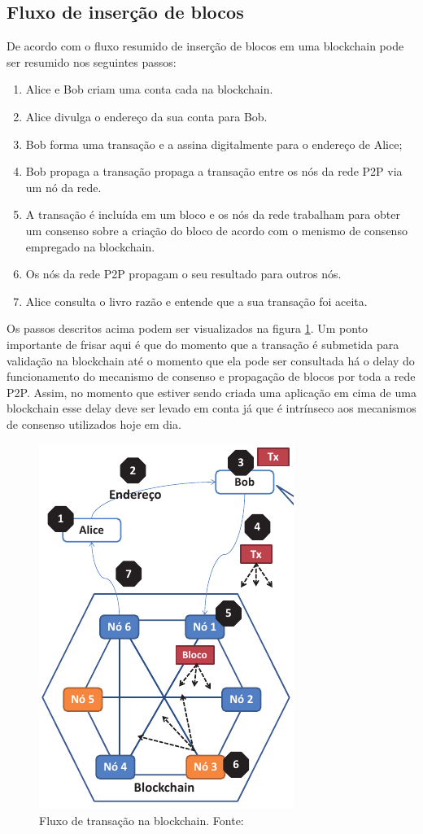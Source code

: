 \documentclass[12pt]{article}
\begin{document}
\subsection{Fluxo de inserção de blocos}
De acordo com \cite{braga2017segurancca} o fluxo resumido de inserção de blocos em uma blockchain pode ser resumido nos seguintes passos:
\begin{enumerate}
    \item Alice e Bob criam uma conta cada na blockchain.
    \item Alice divulga o endereço da sua conta para Bob.
    \item Bob forma uma transação e a assina digitalmente para o endereço de Alice;
    \item Bob propaga a transação propaga a transação entre os nós da rede P2P via um nó da rede.
    \item A transação é incluída em um bloco e os nós da rede trabalham para obter um consenso sobre a criação do bloco de acordo com o menismo de consenso empregado na blockchain.
    \item Os nós da rede P2P propagam o seu resultado para outros nós.
    \item Alice consulta o livro razão e entende que a sua transação foi aceita.
\end{enumerate}
Os passos descritos acima podem ser visualizados na figura \ref{fig:transacao_blockchain}. Um ponto importante de frisar aqui é que do momento que a transação é submetida para validação na blockchain até o momento que ela pode ser consultada há o delay do funcionamento do mecanismo de consenso e propagação de blocos por toda a rede P2P. Assim, no momento que estiver sendo criada uma aplicação em cima de uma blockchain esse delay deve ser levado em conta já que é intrínseco aos mecanismos de consenso utilizados hoje em dia.
\begin{figure}[H]
    \centering
    \includegraphics[scale=0.7]{Imagens/passos_transação.png}
    \caption{Fluxo de transação na blockchain. Fonte: \cite{braga2017segurancca}}
    \label{fig:transacao_blockchain}
\end{figure}
\end{document}
